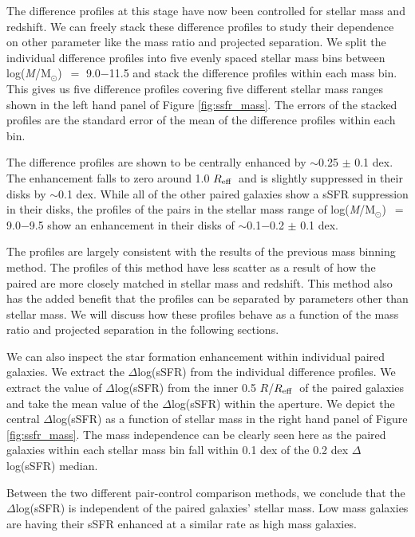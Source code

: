 \documentclass[iop,revtex4,twocolumn,apj,numberedappendix,appendixfloats]{emulateapj}
\newcommand{\reff}{$R_{\rm eff}$}
\newcommand{\logm}{log({\it M}/M$_{\odot}$)}
\begin{document}
The difference profiles at this stage have now been controlled for stellar mass and redshift. We can freely stack these difference profiles to study their dependence on other parameter like the mass ratio and projected separation. We split the individual difference profiles into five evenly spaced stellar mass bins between \logm\ $=$ 9.0$-$11.5 and stack the difference profiles within each mass bin. This gives us five difference profiles covering five different stellar mass ranges shown in the left hand panel of Figure \ref{fig:ssfr_mass}. The errors of the stacked profiles are the standard error of the mean of the difference profiles within each bin.

The difference profiles are shown to be centrally enhanced by $\sim$0.25 $\pm$ 0.1 dex. The enhancement falls to zero around 1.0 \reff\ and is slightly suppressed in their disks by $\sim$0.1 dex. While all of the other paired galaxies show a sSFR suppression in their disks, the profiles of the pairs in the stellar mass range of \logm\ $=$ 9.0$-$9.5 show an enhancement in their disks of $\sim$0.1$-$0.2 $\pm$ 0.1 dex. 

The profiles are largely consistent with the results of the previous mass binning method. The profiles of this method have less scatter as a result of how the paired are more closely matched in stellar mass and redshift. This method also has the added benefit that the profiles can be separated by parameters other than stellar mass. We will discuss how these profiles behave as a function of the mass ratio and projected separation in the following sections. 

We can also inspect the star formation enhancement within individual paired galaxies. We extract the $\Delta$log(sSFR) from the individual difference profiles. We extract the value of $\Delta$log(sSFR) from the inner 0.5 $R$/\reff\ of the paired galaxies and take the mean value of the $\Delta$log(sSFR) within the aperture. We depict the central $\Delta$log(sSFR) as a function of stellar mass in the right hand panel of Figure \ref{fig:ssfr_mass}. The mass independence can be clearly seen here as the paired galaxies within each stellar mass bin fall within 0.1 dex of the 0.2 dex $\Delta$log(sSFR) median. 

Between the two different pair-control comparison methods, we conclude that the $\Delta$log(sSFR) is independent of the paired galaxies' stellar mass. Low mass galaxies are having their sSFR enhanced at a similar rate as high mass galaxies. 
\end{document}
